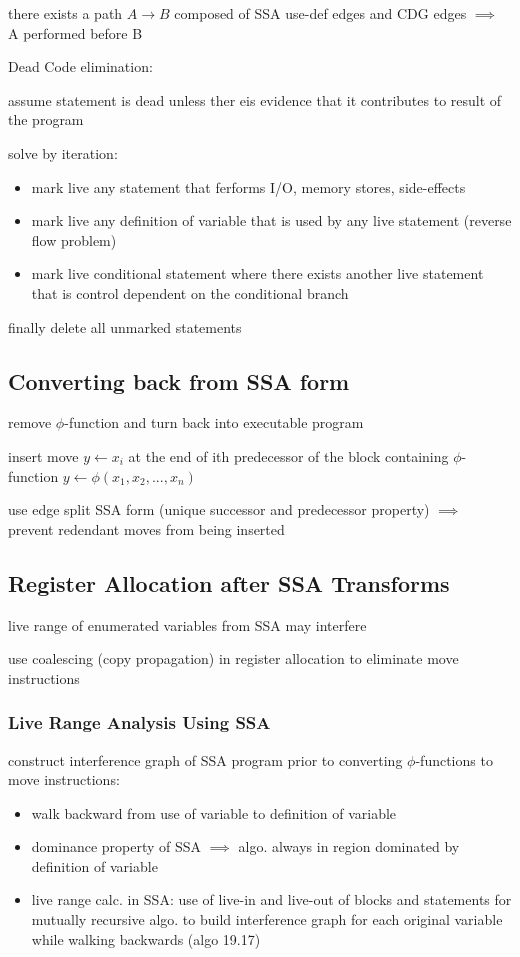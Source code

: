 \documentclass[8pt]{extarticle}
\begin{document}
\begin{multicols*}{2}
  there exists a path $A \rightarrow B$ composed of SSA use-def edges and CDG edges $\implies$ A performed before B
  
  Dead Code elimination:

  assume statement is dead unless ther eis evidence that it contributes to result of the program

  solve by iteration:
  \begin{itemize}
  \item mark live any statement that ferforms I/O, memory stores, side-effects
  \item mark live any definition of variable that is used by any live statement (reverse flow problem)
  \item mark live conditional statement where there exists another live statement that is control dependent on the conditional branch
  \end{itemize}

  finally delete all unmarked statements

  \subsection{Converting back from SSA form}

  remove $\phi$-function and turn back into executable program

  insert move $y \leftarrow x_i$ at the end of ith predecessor of the block containing $\phi$-function $y \leftarrow \phi(x_1, x_2,...,x_n)$

  use edge split SSA form (unique successor and predecessor property) $\implies$ prevent redendant moves from being inserted


  \subsection{Register Allocation after SSA Transforms}

  live range of enumerated variables from SSA may interfere

  use coalescing (copy propagation) in register allocation to eliminate move instructions

  \subsubsection{Live Range Analysis Using SSA}

  construct interference graph of SSA program prior to converting $\phi$-functions to move instructions:
  \begin{itemize}
  \item walk backward from use of variable to definition of variable
  \item dominance property of SSA $\implies$ algo. always in region dominated by definition of variable
  \item live range calc. in SSA: use of live-in and live-out of blocks and statements for mutually recursive algo. to build interference graph for each original variable while walking backwards (algo 19.17)
  \end{itemize}


\end{multicols*}
\end{document}
